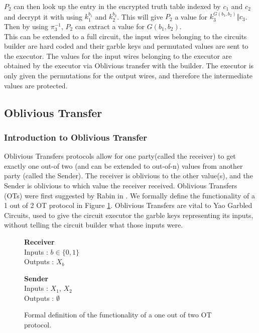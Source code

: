 \documentclass[a4paper,10pt]{article}
\begin{document}
		$P_2$ can then look up the entry in the encrypted truth table indexed by $c_1$ and $c_2$ and decrypt it with using $k_1^{b_1}$ and  $k_2^{b_2}$. This will give $P_2$ a value for $k_3^{G(b_1, b_2)} \Vert c_3$. Then by using $\pi_3^{-1}$, $P_2$ can extract a value for $G(b_1, b_2)$.\\

		This can be extended to a full circuit, the input wires belonging to the circuits builder are hard coded and their garble keys and permutated values are sent to the executor. The values for the input wires belonging to the executor are obtained by the executor via Oblivious transfer with the builder. The executor is only given the permutations for the output wires, and therefore the intermediate values are protected.



	\subsection{Oblivious Transfer} \label{OT_Intro}
		\subsubsection{Introduction to Oblivious Transfer}
			Oblivious Transfers protocols allow for one party(called the receiver) to get exactly one out-of two (and can be extended to out-of-n) values from another party (called the Sender). The receiver is oblivious to the other value(s), and the Sender is oblivious to which value the receiver received. Oblivious Transfers (OTs) were first suggested by Rabin in \cite{Rabin81}. We formally define the functionality of a 1 out of 2 OT protocol in Figure \ref{fig:OTformalDef}. Oblivious Transfers are vital to Yao Garbled Circuits, used to give the circuit executor the garble keys representing its inputs, without telling the circuit builder what those inputs were.\\

			\begin{figure}[!htb]
    				\centering
    				\begin{minipage}{0.45\textwidth}
    	    			\centering
					\textbf{Receiver}\\
					Inputs : $b \in \{0, 1\}$\\
					Outputs : $X_b$\\
    				\end{minipage}
    				\begin{minipage}{0.45\textwidth}
       				\centering
					\textbf{Sender}\\
					Inputs : $X_1$, $X_2$\\
					Outputs : $\emptyset$\\
   				\end{minipage}

				\caption{ Formal definition of the functionality of a one out of two OT protocol.\label{fig:OTformalDef}}
			\end{figure}
\end{document}
